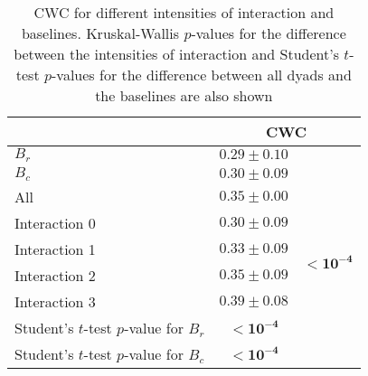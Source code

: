 \begin{table}
\centering
\caption{CWC for different intensities of interaction and baselines. Kruskal-Wallis $p$-values for the difference between the intensities of interaction and Student's $t$-test $p$-values for the difference between all dyads and the baselines are also shown\label{tab:coherence_interaction}}
\begin{tabular}{lcc}
\toprule
 & \multicolumn{2}{c}{CWC} \\
\midrule
$B_r$ & $0.29 \pm 0.10$ & \\
$B_c$ & $0.30 \pm 0.09$ & \\
\midrule
All & $0.35 \pm 0.00$ & \\
\midrule
Interaction 0 & $0.30 \pm 0.09$ & \multirow{4}{*}{$\mathbf{< 10^{-4}}$} \\
Interaction 1 & $0.33 \pm 0.09$ & \\
Interaction 2 & $0.35 \pm 0.09$ & \\
Interaction 3 & $0.39 \pm 0.08$ & \\
\midrule
Student's $t$-test $p$-value for $B_r$ & $\mathbf{< 10^{-4}}$  &\\
Student's $t$-test $p$-value for $B_c$ & $\mathbf{< 10^{-4}}$ &\\
\bottomrule
\end{tabular}
\end{table}
